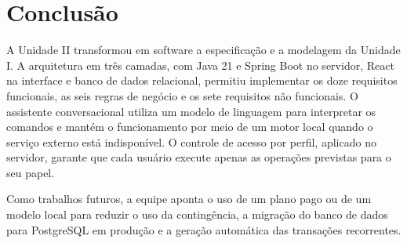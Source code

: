 \documentclass[12pt,oneside,a4paper,article]{abntex2}
\begin{document}
\section{Conclusão}

A Unidade II transformou em software a especificação e a modelagem da Unidade I. A arquitetura em três camadas, com Java 21 e Spring Boot no servidor, React na interface e banco de dados relacional, permitiu implementar os doze requisitos funcionais, as seis regras de negócio e os sete requisitos não funcionais. O assistente conversacional utiliza um modelo de linguagem para interpretar os comandos e mantém o funcionamento por meio de um motor local quando o serviço externo está indisponível. O controle de acesso por perfil, aplicado no servidor, garante que cada usuário execute apenas as operações previstas para o seu papel.

Como trabalhos futuros, a equipe aponta o uso de um plano pago ou de um modelo local para reduzir o uso da contingência, a migração do banco de dados para PostgreSQL em produção e a geração automática das transações recorrentes.


\end{document}
